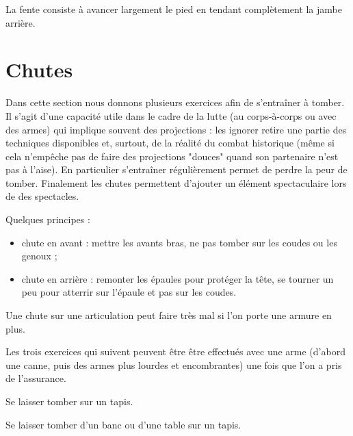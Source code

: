 \begin{definition}[Fente]

La fente consiste à avancer largement le pied en tendant complètement la jambe arrière.
\end{definition}




\section{Chutes}


Dans cette section nous donnons plusieurs exercices afin de s'entraîner à tomber.
Il s'agit d'une capacité utile dans le cadre de la lutte (au corps-à-corps ou avec des armes) qui implique souvent des projections : les ignorer retire une partie des techniques disponibles et, surtout, de la réalité du combat historique (même si cela n'empêche pas de faire des projections "douces" quand son partenaire n'est pas à l'aise).
En particulier s'entraîner régulièrement permet de perdre la peur de tomber.
Finalement les chutes permettent d'ajouter un élément spectaculaire lors de des spectacles.


\noindent
Quelques principes :
\begin{itemize}
	\item chute en avant : mettre les avants bras, ne pas tomber sur les coudes ou les genoux ;
	\item chute en arrière : remonter les épaules pour protéger la tête, se tourner un peu pour atterrir sur l'épaule et pas sur les coudes.
\end{itemize}
Une chute sur une articulation peut faire très mal si l'on porte une armure en plus.


Les trois exercices qui suivent peuvent être être effectués avec une arme (d'abord une canne, puis des armes plus lourdes et encombrantes) une fois que l'on a pris de l'assurance.


\begin{exercice}[Chute]

Se laisser tomber sur un tapis.

\end{exercice}


\begin{exercice}

Se laisser tomber d'un banc ou d'une table sur un tapis.

\end{exercice}


